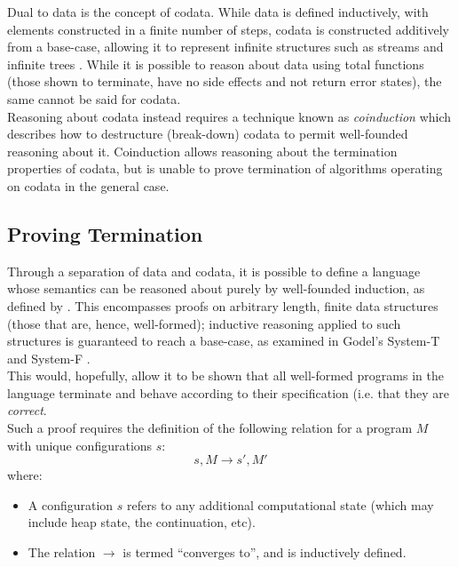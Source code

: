 \documentclass[a4paper,11pt]{report}
\begin{document}
Dual to data is the concept of codata.
While data is defined inductively, with elements constructed in a finite number of steps, codata is constructed additively from a base-case, allowing it to represent infinite structures such as streams and infinite trees \citep{hinze2010reasoning}.
While it is possible to reason about data using total functions (those shown to terminate, have no side effects and not return error states), the same cannot be said for codata.\\

Reasoning about codata instead requires a technique known as \textit{coinduction} which describes how to destructure (break-down) codata to permit well-founded reasoning about it. 
Coinduction allows reasoning about the termination properties of codata, but is unable to prove termination of algorithms operating on codata in the general case. 


\subsection{Proving Termination} %
\label{sub:proving_termination}
Through a separation of data and codata, it is possible to define a language whose semantics can be reasoned about purely by well-founded induction, as defined by \citet{nordstrom1988terminating}. 
This encompasses proofs on arbitrary length, finite data structures (those that are, hence, well-formed); inductive reasoning applied to such structures is guaranteed to reach a base-case, as examined in Godel's System-T and System-F \citep{alves2010godel,girard1989proofs}.\\

This would, hopefully, allow it to be shown that all well-formed programs in the language terminate and behave according to their specification (i.e. that they are \textit{correct}.\\

Such a proof requires the definition of the following relation for a program $M$ with unique configurations $s$:
\begin{equation*}
    s, M \rightarrow s', M'
\end{equation*}
where:
\begin{itemize}
    \item A configuration $s$ refers to any additional computational state (which may include heap state, the continuation, etc).
    \item The relation $\rightarrow$ is termed ``converges to'', and is inductively defined.
\end{itemize}
\end{document}
